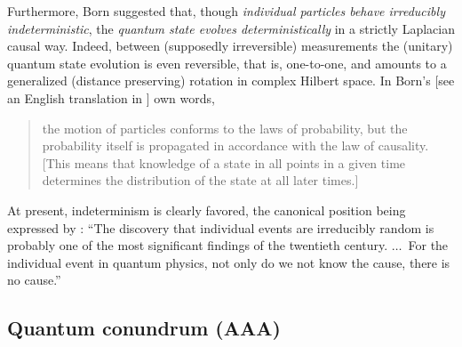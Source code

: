 \documentclass[%
 reprint,
 showpacs,
 showkeys,
 preprintnumbers,
 amsmath,amssymb,
 aps,
 prl,
  longbibliography,
 ]{revtex4-1}
\begin{document}
Furthermore, Born suggested that, though {\em individual particles behave irreducibly indeterministic},
the {\em quantum state evolves deterministically}  in a strictly Laplacian causal way.
Indeed, between (supposedly irreversible) measurements the (unitary) quantum state evolution
is even reversible, that is, one-to-one, and amounts to a  generalized (distance preserving) rotation in complex Hilbert space.
In Born's \citeyearpar[804]{born-26-2} [see an English translation in \citet[302]{jammer:89}] own words,
\begin{quote}
{the motion of particles conforms to the laws of probability, but the probability itself
is propagated in accordance with the law of causality.
[This means that knowledge of a state in all points in a given time determines the distribution of
the state at all later times.]
}
\end{quote}

At present, indeterminism is clearly favored, the canonical position being expressed by \citet{zeil-05_nature_ofQuantum}:
{``The discovery that individual events are
irreducibly random is probably one of the
most significant findings of the twentieth
century. $\ldots$~For the individual event in quantum physics,
not only do we not know the cause, there is no cause.''}

\subsection{Quantum conundrum (AAA)}
\end{document}
